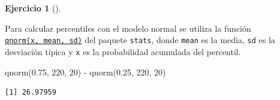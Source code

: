 \documentclass[
  a4paper,
]{scrreport}
\newenvironment{Shaded}{\begin{snugshade}}{\end{snugshade}}
\newcommand{\DecValTok}[1]{\textcolor[rgb]{0.68,0.00,0.00}{#1}}
\newcommand{\FloatTok}[1]{\textcolor[rgb]{0.68,0.00,0.00}{#1}}
\newcommand{\FunctionTok}[1]{\textcolor[rgb]{0.28,0.35,0.67}{#1}}
\newcommand{\NormalTok}[1]{\textcolor[rgb]{0.00,0.23,0.31}{#1}}
\newcommand{\SpecialCharTok}[1]{\textcolor[rgb]{0.37,0.37,0.37}{#1}}
\theoremstyle{definition}
\newtheorem{exercise}{Ejercicio}[chapter]
\theoremstyle{remark}
\begin{document}
\begin{exercise}[]
\begin{enumerate}
  \begin{tcolorbox}[enhanced jigsaw, breakable, toptitle=1mm, colbacktitle=quarto-callout-tip-color!10!white, rightrule=.15mm, opacityback=0, opacitybacktitle=0.6, titlerule=0mm, coltitle=black, colframe=quarto-callout-tip-color-frame, colback=white, bottomtitle=1mm, leftrule=.75mm, toprule=.15mm, title=\textcolor{quarto-callout-tip-color}{\faLightbulb}\hspace{0.5em}{Solución}, arc=.35mm, bottomrule=.15mm, left=2mm]

  Para calcular percentiles con el modelo normal se utiliza la función
  \href{https://www.rdocumentation.org/packages/stats/versions/3.3/topics/Normal}{\texttt{qnorm(x,\ mean,\ sd)}}
  del paquete \texttt{stats}, donde \texttt{mean} es la media,
  \texttt{sd} es la desviación típica y \texttt{x} es la probabilidad
  acumulada del percentil.

\begin{Shaded}
\begin{Highlighting}[]
\FunctionTok{qnorm}\NormalTok{(}\FloatTok{0.75}\NormalTok{, }\DecValTok{220}\NormalTok{, }\DecValTok{20}\NormalTok{) }\SpecialCharTok{{-}} \FunctionTok{qnorm}\NormalTok{(}\FloatTok{0.25}\NormalTok{, }\DecValTok{220}\NormalTok{, }\DecValTok{20}\NormalTok{)}
\end{Highlighting}
\end{Shaded}

\begin{verbatim}
[1] 26.97959
\end{verbatim}

  \end{tcolorbox}
\end{enumerate}

\end{exercise}
\end{document}
